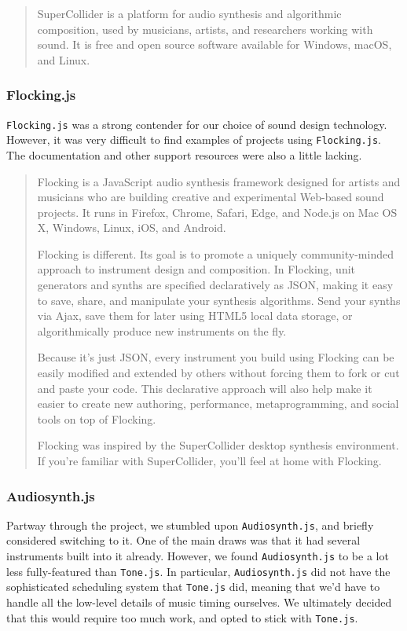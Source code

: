 \documentclass[12pt,a4paper]{article}
\newcommand{\lightcode}[1]{\colorbox{light-gray}{\texttt{#1}}}
\begin{document}
\begin{quote}
SuperCollider is a platform for audio synthesis and algorithmic composition, used by musicians, artists, and researchers working with sound. It is free and open source software available for Windows, macOS, and Linux. \cite{supercollider}
\end{quote}

\subsubsection{Flocking.js}
\lightcode{Flocking.js} was a strong contender for our choice of sound design technology. However, it was very difficult to find examples of projects using \lightcode{Flocking.js}. The documentation and other support resources were also a little lacking.

\begin{quote}
Flocking is a JavaScript audio synthesis framework designed for artists and musicians who are building creative and experimental Web-based sound projects. It runs in Firefox, Chrome, Safari, Edge, and Node.js on Mac OS X, Windows, Linux, iOS, and Android.

Flocking is different. Its goal is to promote a uniquely community-minded approach to instrument design and composition. In Flocking, unit generators and synths are specified declaratively as JSON, making it easy to save, share, and manipulate your synthesis algorithms. Send your synths via Ajax, save them for later using HTML5 local data storage, or algorithmically produce new instruments on the fly.

Because it's just JSON, every instrument you build using Flocking can be easily modified and extended by others without forcing them to fork or cut and paste your code. This declarative approach will also help make it easier to create new authoring, performance, metaprogramming, and social tools on top of Flocking.

Flocking was inspired by the SuperCollider desktop synthesis environment. If you're familiar with SuperCollider, you'll feel at home with Flocking. \cite{flocking}
\end{quote}

\subsubsection{Audiosynth.js}

Partway through the project, we stumbled upon \lightcode{Audiosynth.js}, and briefly considered switching to it. One of the main draws was that it had several instruments built into it already. However, we found \lightcode{Audiosynth.js} to be a lot less fully-featured than \lightcode{Tone.js}. In particular, \lightcode{Audiosynth.js} did not have the sophisticated scheduling system that \lightcode{Tone.js} did, meaning that we'd have to handle all the low-level details of music timing ourselves. We ultimately decided that this would require too much work, and opted to stick with \lightcode{Tone.js}.
\end{document}
